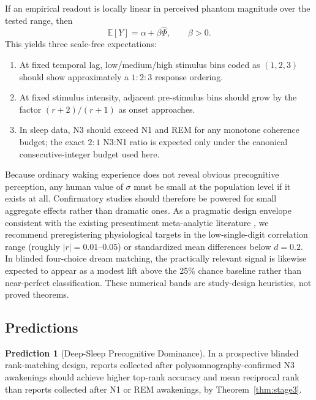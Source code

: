\documentclass[11pt, a4paper]{article}
\theoremstyle{definition}
\newtheorem{prediction}[theorem]{Prediction}
\theoremstyle{remark}
\begin{document}
If an empirical readout is locally linear in perceived phantom
magnitude over the tested range, then
\begin{equation}\label{eq:linear-readout}
    \mathbb{E}[Y] = \alpha + \beta \widehat{\Phi},
    \qquad \beta > 0.
\end{equation}
This yields three scale-free expectations:
\begin{enumerate}
    \item At fixed temporal lag, low/medium/high stimulus bins coded
    as $(1,2,3)$ should show approximately a $1:2:3$ response
    ordering.
    \item At fixed stimulus intensity, adjacent pre-stimulus bins
    should grow by the factor $(r+2)/(r+1)$ as onset approaches.
    \item In sleep data, N3 should exceed N1 and REM for any monotone
    coherence budget; the exact $2:1$ N3:N1 ratio is expected only
    under the canonical consecutive-integer budget used here.
\end{enumerate}

Because ordinary waking experience does not reveal obvious
precognitive perception, any human value of $\sigma$ must be small at
the population level if it exists at all. Confirmatory studies should
therefore be powered for small aggregate effects rather than dramatic
ones. As a pragmatic design envelope consistent with the existing
presentiment meta-analytic literature \cite{Mossbridge2012}, we
recommend preregistering physiological targets in the low-single-digit
correlation range (roughly $|r| = 0.01$--$0.05$) or standardized mean
differences below $d = 0.2$. In blinded four-choice dream matching,
the practically relevant signal is likewise expected to appear as a
modest lift above the 25\% chance baseline rather than near-perfect
classification. These numerical bands are study-design heuristics,
not proved theorems.

\subsection{Predictions}

\begin{prediction}[Deep-Sleep Precognitive Dominance]\label{pred:sleep}
In a prospective blinded rank-matching design, reports collected
after polysomnography-confirmed N3 awakenings should achieve higher
top-rank accuracy and mean reciprocal rank than reports collected
after N1 or REM awakenings, by Theorem~\ref{thm:stage3}.
\end{prediction}
\end{document}
